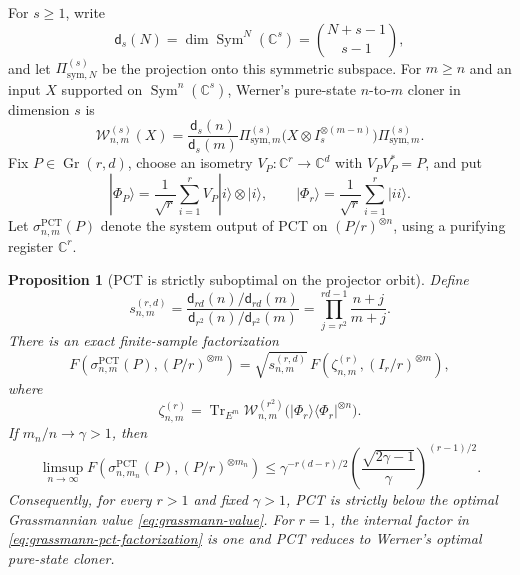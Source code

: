 \documentclass[11pt]{article}
\newtheorem{proposition}[proposition]{Proposition}
\theoremstyle{remark}
\theoremstyle{plain}
\newcommand{\C}{\mathbb C}
\newcommand{\Gr}{\operatorname{Gr}}
\newcommand{\Tr}{\operatorname{Tr}}
\newcommand{\ket}[1]{|#1\rangle}
\newcommand{\proj}[1]{|#1\rangle\!\langle #1|}
\newcommand{\ot}{\otimes}
\begin{document}
For \(s\ge1\), write
\[
  \mathsf d_s(N)=\dim\operatorname{Sym}^N(\C^s)
  =\binom{N+s-1}{s-1},
\]
and let \(\Pi_{\mathrm{sym},N}^{(s)}\) be the projection onto this
symmetric subspace.  For \(m\ge n\) and an input \(X\) supported on
\(\operatorname{Sym}^n(\C^s)\), Werner's pure-state \(n\)-to-\(m\) cloner
in dimension \(s\) is
\begin{equation}
  \mathcal W_{n,m}^{(s)}(X)
  =\frac{\mathsf d_s(n)}{\mathsf d_s(m)}
   \Pi_{\mathrm{sym},m}^{(s)}
   \bigl(X\ot I_s^{\ot(m-n)}\bigr)
   \Pi_{\mathrm{sym},m}^{(s)}.
  \label{eq:grassmann-werner-cloner}
\end{equation}
Fix \(P\in\Gr(r,d)\), choose an isometry
\(V_P:\C^r\to\C^d\) with \(V_PV_P^*=P\), and put
\[
  \ket{\Phi_P}
  =\frac1{\sqrt r}\sum_{i=1}^r V_P\ket i\ot\ket i,
  \qquad
  \ket{\Phi_r}=\frac1{\sqrt r}\sum_{i=1}^r\ket{ii}.
\]
Let \(\sigma_{n,m}^{\mathrm{PCT}}(P)\) denote the system output of PCT
on \((P/r)^{\ot n}\), using a purifying register \(\C^r\).

\begin{proposition}[PCT is strictly suboptimal on the projector orbit]
\label{prop:grassmann-pct-comparison}
Define
\begin{equation}
  s_{n,m}^{(r,d)}
  =\frac{\mathsf d_{rd}(n)/\mathsf d_{rd}(m)}
         {\mathsf d_{r^2}(n)/\mathsf d_{r^2}(m)}
  =\prod_{j=r^2}^{rd-1}\frac{n+j}{m+j}.
  \label{eq:grassmann-pct-support-factor}
\end{equation}
There is an exact finite-sample factorization
\begin{equation}
  F\!\left(
    \sigma_{n,m}^{\mathrm{PCT}}(P),(P/r)^{\ot m}
  \right)
  =\sqrt{s_{n,m}^{(r,d)}}\,
   F\!\left(\zeta_{n,m}^{(r)},(I_r/r)^{\ot m}\right),
  \label{eq:grassmann-pct-factorization}
\end{equation}
where
\begin{equation}
  \zeta_{n,m}^{(r)}
  =\Tr_{E^m}\mathcal W_{n,m}^{(r^2)}
    \bigl(\proj{\Phi_r}^{\ot n}\bigr).
  \label{eq:grassmann-pct-internal-state}
\end{equation}
If \(m_n/n\to\gamma>1\), then
\begin{equation}
  \limsup_{n\to\infty}
  F\!\left(
    \sigma_{n,m_n}^{\mathrm{PCT}}(P),(P/r)^{\ot m_n}
  \right)
  \le
  \gamma^{-r(d-r)/2}
  \left(\frac{\sqrt{2\gamma-1}}{\gamma}\right)^{(r-1)/2}.
  \label{eq:grassmann-pct-upper-bound}
\end{equation}
Consequently, for every \(r>1\) and fixed \(\gamma>1\), PCT is strictly
below the optimal Grassmannian value \eqref{eq:grassmann-value}.  For
\(r=1\), the internal factor in
\eqref{eq:grassmann-pct-factorization} is one and PCT reduces to Werner's
optimal pure-state cloner.
\end{proposition}
\end{document}
